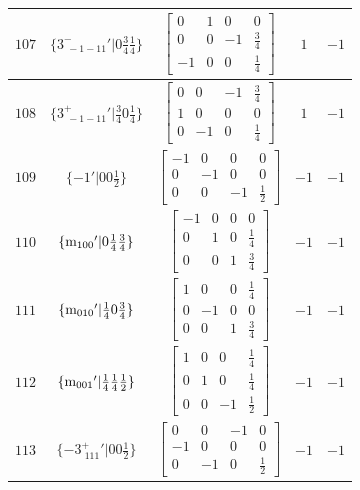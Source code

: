 \documentclass[fleqn,8pt]{jsarticle}
\begin{document}
\begin{longtable}{ccccc}
$ 107 $ & $ \{3^{-}_{\,\,-1-11}{}'|0 \frac{3}{4} \frac{1}{4}\} $ & $ \begin{bmatrix} 0 & 1 & 0 & 0 \\ 0 & 0 & -1 & \frac{3}{4} \\ -1 & 0 & 0 & \frac{1}{4} \end{bmatrix} $ & $ 1 $ & $ -1 $ \\ \hline
$ 108 $ & $ \{3^{+}_{\,\,-1-11}{}'|\frac{3}{4} 0 \frac{1}{4}\} $ & $ \begin{bmatrix} 0 & 0 & -1 & \frac{3}{4} \\ 1 & 0 & 0 & 0 \\ 0 & -1 & 0 & \frac{1}{4} \end{bmatrix} $ & $ 1 $ & $ -1 $ \\ \hline
$ 109 $ & $ \{-1{}'|0 0 \frac{1}{2}\} $ & $ \begin{bmatrix} -1 & 0 & 0 & 0 \\ 0 & -1 & 0 & 0 \\ 0 & 0 & -1 & \frac{1}{2} \end{bmatrix} $ & $ -1 $ & $ -1 $ \\ \hline
$ 110 $ & $ \{{\rm m}_{100}{}'|0 \frac{1}{4} \frac{3}{4}\} $ & $ \begin{bmatrix} -1 & 0 & 0 & 0 \\ 0 & 1 & 0 & \frac{1}{4} \\ 0 & 0 & 1 & \frac{3}{4} \end{bmatrix} $ & $ -1 $ & $ -1 $ \\ \hline
$ 111 $ & $ \{{\rm m}_{010}{}'|\frac{1}{4} 0 \frac{3}{4}\} $ & $ \begin{bmatrix} 1 & 0 & 0 & \frac{1}{4} \\ 0 & -1 & 0 & 0 \\ 0 & 0 & 1 & \frac{3}{4} \end{bmatrix} $ & $ -1 $ & $ -1 $ \\ \hline
$ 112 $ & $ \{{\rm m}_{001}{}'|\frac{1}{4} \frac{1}{4} \frac{1}{2}\} $ & $ \begin{bmatrix} 1 & 0 & 0 & \frac{1}{4} \\ 0 & 1 & 0 & \frac{1}{4} \\ 0 & 0 & -1 & \frac{1}{2} \end{bmatrix} $ & $ -1 $ & $ -1 $ \\ \hline
$ 113 $ & $ \{-3^{+}_{\,\,111}{}'|0 0 \frac{1}{2}\} $ & $ \begin{bmatrix} 0 & 0 & -1 & 0 \\ -1 & 0 & 0 & 0 \\ 0 & -1 & 0 & \frac{1}{2} \end{bmatrix} $ & $ -1 $ & $ -1 $ \\ \hline

\end{longtable}
\end{document}
